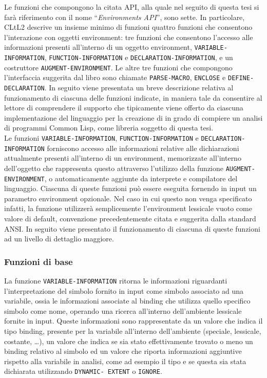 Le funzioni che compongono la citata API, alla quale nel seguito di questa tesi
si farà riferimento con il nome \enquote{\textit{Environments API}}, sono sette.
In particolare, CLtL2 descrive un insieme minimo di funzioni quattro funzioni
che consentono l’interazione con oggetti environment: tre funzioni che
consentono l’accesso alle informazioni presenti all’interno di un oggetto
environment, \texttt {VARIABLE-INFORMATION}, \texttt{FUNCTION-INFORMATION} e
\texttt {DECLARATION-INFORMATION}, e un costruttore
\texttt{AUGMENT-ENVIRONMENT}. Le altre tre funzioni che compongono l’interfaccia
suggerita dal libro sono chiamate \texttt {PARSE-MACRO}, \texttt{ENCLOSE} e
\texttt{DEFINE-DECLARATION}. In seguito viene presentata un breve descrizione
relativa al funzionamento di ciascuna delle funzioni indicate, in maniera tale
da consentire al lettore di comprendere il supporto che tipicamente viene
offerto da ciascuna implementazione del linguaggio per la creazione di in grado
di compiere un analisi di programmi Common Lisp, come libreria soggetto di
questa tesi.\\

Le funzioni \texttt{VARIABLE-INFORMATION}, \texttt{FUNCTION-INFORMATION} e
\texttt{DECLARATION-INFORMATION} forniscono accesso alle informazioni relative
alle dichiarazioni attualmente presenti all’interno di un environment,
memorizzate all’interno dell’oggetto che rappresenta questo attraverso
l’utilizzo della funzione \texttt{AUGMENT-ENVIRONMENT}, o automaticamente
aggiunte da interprete e compilatore del linguaggio. Ciascuna di queste funzioni
può essere eseguita fornendo in input un parametro environment opzionale. Nel
caso in cui questo non venga specificato infatti, la funzione utilizzerà
semplicemente l’environment lessicale vuoto come valore di default, convenzione
precedentemente citata e suggerita dalla standard ANSI. In seguito viene
presentato il funzionamento di ciascuna di queste funzioni ad un livello di
dettaglio maggiore.

\subsubsection{Funzioni di base}

La funzione \texttt{VARIABLE-INFORMATION} ritorna le informazioni riguardanti
l’interpretazione del simbolo fornito in input come simbolo associato ad una
variabile, ossia le informazioni associate al binding che utilizza quello
specifico simbolo come nome, operando una ricerca all’interno dell'ambiente
lessicale fornite in input. Queste informazioni sono rappresentate da un valore
che indica il tipo binding, presente per la variabile all’interno dell’ambiente
(speciale, lessicale, costante, \dots), un valore che indica se sia stato
effettivamente trovato o meno un binding relativo al simbolo ed un valore che
riporta informazioni aggiuntive rispetto alla variabile in analisi, come ad
esempio il tipo e se questa sia stata dichiarata utilizzando \texttt {DYNAMIC-
EXTENT} o \texttt{IGNORE}.\\


